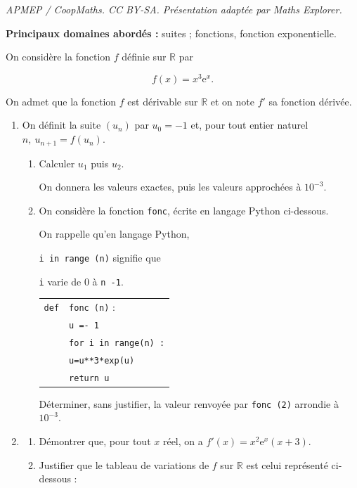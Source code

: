 \documentclass[10pt]{article}
\providecommand{\R}{\mathbb{R}}
\providecommand{\e}{{\mathrm{e}}}
\begin{document}
\noindent\textit{APMEP / CoopMaths. CC BY-SA. Présentation adaptée par Maths Explorer.}\par\medskip
\medskip

\textbf{Principaux domaines abordés :}
suites ;
fonctions, fonction exponentielle.

\medskip

On considère la fonction $f$ définie sur $\R$ par

\[f(x) = x^3\e^x.\]

On admet que la fonction $f$ est dérivable sur $\R$ et on note $f'$ sa fonction dérivée.

\medskip

\begin{enumerate}
\item On définit la suite $\left(u_n\right)$ par $u_0 = - 1$ et, pour tout entier naturel $n,\: u_{n+1} = f\left(u_n\right)$.
	\begin{enumerate}
		\item Calculer $u_1$ puis $u_2$.
		
On donnera les valeurs exactes, puis les valeurs approchées à $10^{-3}$.
		\item On considère la fonction \texttt{fonc}, écrite en langage Python ci-dessous.

\smallskip

\begin{minipage}{0.524\linewidth}
On rappelle qu'en langage Python, 

\og \texttt{i in range (n)}\fg{} signifie que 

\texttt{i} varie de 0 à \texttt{n -1}.
\end{minipage}\hfill
\begin{minipage}{0.40\linewidth}
\begin{tabular}{|l l|}\hline
\texttt{def}& \texttt{fonc (n)} :\\
&\texttt{u =- 1}\\
&\texttt{for i in range(n) :}\\
&\quad \texttt{u=u**3*exp(u)}\\
&\texttt{return u}\\\hline
\end{tabular}
\end{minipage}

Déterminer, sans justifier, la valeur renvoyée par \texttt{fonc (2)} arrondie à $10^{-3}$.
	\end{enumerate}
\item 
	\begin{enumerate}
		\item Démontrer que, pour tout $x$ réel, on a $f'(x) = x^2\e^x(x + 3)$.
		\item Justifier que le tableau de variations de $f$ sur $\R$ est celui représenté
ci-dessous :


\end{enumerate}
\end{enumerate}
\end{document}
